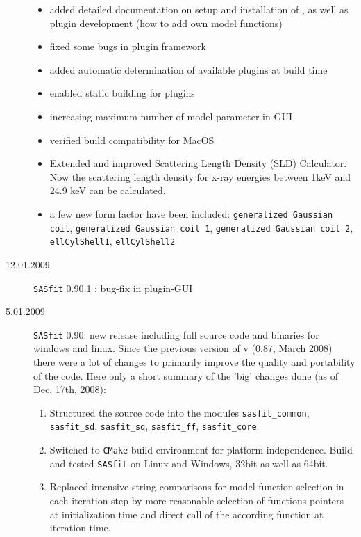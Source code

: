 \begin{description}
\begin{itemize}
            \item added detailed documentation on setup and installation of \SASfit,
                  as well as plugin development (how to add own model functions)
            \item fixed some bugs in plugin framework
            \item added automatic determination of available plugins at build time
            \item enabled static building for plugins
            \item increasing maximum number of model parameter in GUI
            \item verified build compatibility for MacOS
            \item Extended and improved Scattering Length Density (SLD) Calculator.
                  Now the scattering length density for x-ray energies between 1keV
                  and 24.9 keV can be calculated.
            \item a few new form factor have been included:
                        \texttt{generalized Gaussian coil},
                        \texttt{generalized Gaussian coil 1},
                        \texttt{generalized Gaussian coil 2},
                        \texttt{ellCylShell1},
                        \texttt{ellCylShell2}
        \end{itemize}
    \item[12.01.2009]{\tt SASfit} 0.90.1 : bug-fix in plugin-GUI
    \item[5.01.2009] {\tt SASfit} 0.90:
    new release including full source code and binaries for
    windows and linux. Since the previous version of v (0.87, March 2008)
    there were a lot of changes to primarily improve the quality
    and portability of the code. Here only a short summary of the 'big'
    changes done (as of Dec. 17th, 2008):
    \begin{enumerate}
        \item Structured the source code into the modules \texttt{sasfit\_common}, \texttt{sasfit\_sd}, \texttt{sasfit\_sq},
                \texttt{sasfit\_ff}, \texttt{sasfit\_core}.
        \item Switched to {\tt CMake} build environment for platform independence. Build and tested {\tt SASfit} on
                Linux and Windows, 32bit as well as 64bit.
        \item Replaced intensive string comparisons for model function selection in each iteration step by more reasonable
                selection of functions pointers at initialization time and direct call of the according function at iteration time.

\end{enumerate}
\end{description}
